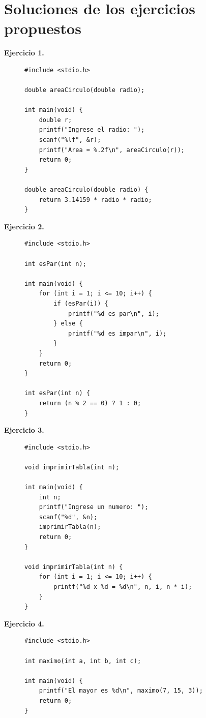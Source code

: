 \documentclass[11pt,letterpaper]{article}
\theoremstyle{definition}
\begin{document}
\section{Soluciones de los ejercicios propuestos}

\begin{description}

\item[\textbf{Ejercicio 1.}]
\begin{lstlisting}
#include <stdio.h>

double areaCirculo(double radio);

int main(void) {
    double r;
    printf("Ingrese el radio: ");
    scanf("%lf", &r);
    printf("Area = %.2f\n", areaCirculo(r));
    return 0;
}

double areaCirculo(double radio) {
    return 3.14159 * radio * radio;
}
\end{lstlisting}

\item[\textbf{Ejercicio 2.}]
\begin{lstlisting}
#include <stdio.h>

int esPar(int n);

int main(void) {
    for (int i = 1; i <= 10; i++) {
        if (esPar(i)) {
            printf("%d es par\n", i);
        } else {
            printf("%d es impar\n", i);
        }
    }
    return 0;
}

int esPar(int n) {
    return (n % 2 == 0) ? 1 : 0;
}
\end{lstlisting}

\item[\textbf{Ejercicio 3.}]
\begin{lstlisting}
#include <stdio.h>

void imprimirTabla(int n);

int main(void) {
    int n;
    printf("Ingrese un numero: ");
    scanf("%d", &n);
    imprimirTabla(n);
    return 0;
}

void imprimirTabla(int n) {
    for (int i = 1; i <= 10; i++) {
        printf("%d x %d = %d\n", n, i, n * i);
    }
}
\end{lstlisting}

\item[\textbf{Ejercicio 4.}]
\begin{lstlisting}
#include <stdio.h>

int maximo(int a, int b, int c);

int main(void) {
    printf("El mayor es %d\n", maximo(7, 15, 3));
    return 0;
}


\end{lstlisting}
\end{description}
\end{document}
